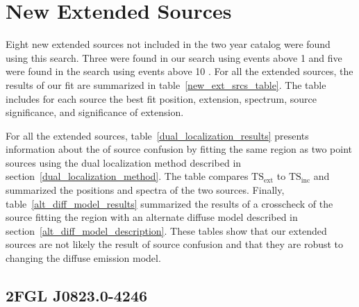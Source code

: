 \documentclass[12pt,preprint]{aastex}
\newcommand{\gev}{\text{GeV}\xspace}
\newcommand{\tsext}{{\ensuremath{\text{TS}_\text{ext}}}\xspace}
\newcommand{\tsinc}{\ensuremath{\text{TS}_\text{inc}}\xspace}
\begin{document}
\section{New Extended Sources}
\label{new_ext_srcs_section}


Eight new extended sources not included in the two year catalog
were found using this search. Three were found in our search using
events above 1 \gev and five were found in the search using events
above 10 \gev.  For all the extended sources, the results of our
fit are summarized in table~\ref{new_ext_srcs_table}. The table
includes for each source the best fit position, extension, spectrum,
source significance, and significance of extension. 

For all the extended sources, table~\ref{dual_localization_results}
presents information about the of source confusion by fitting the same
region as two point sources using the dual localization method described
in section~\ref{dual_localization_method}. The table compares \tsext
to \tsinc and summarized the positions and spectra of the two sources.
Finally, table~\ref{alt_diff_model_results} summarized the results of
a crosscheck of the source fitting the region with an alternate diffuse
model described in section~\ref{alt_diff_model_description}.  These tables
show that our extended sources are not likely the result of source confusion
and that they are robust to changing the diffuse emission model.


\subsection{2FGL J0823.0-4246}
\label{section_2FGL_J0823.0-4246}

\end{document}

